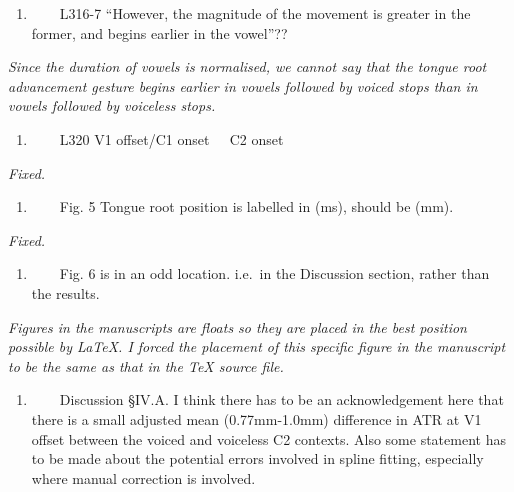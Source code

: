 \documentclass[]{article}
\providecommand{\tightlist}{%
  \setlength{\itemsep}{0pt}\setlength{\parskip}{0pt}}
\begin{document}
\begin{enumerate}
\def\labelenumi{\arabic{enumi}.}
\setcounter{enumi}{11}
\tightlist
\item
  ~~~~L316-7 ``However, the magnitude of the movement is greater in the
  former, and begins earlier in the vowel''??
\end{enumerate}

\begin{adjustwidth}{1cm}{} \textit{
Since the duration of vowels is normalised, we cannot say that the tongue root advancement gesture begins earlier in vowels followed by voiced stops than in vowels followed by voiceless stops.
} \end{adjustwidth}

\begin{enumerate}
\def\labelenumi{\arabic{enumi}.}
\setcounter{enumi}{12}
\tightlist
\item
  ~~~~L320 V1 offset/C1 onset ~ C2 onset
\end{enumerate}

\begin{adjustwidth}{1cm}{} \textit{
Fixed.
} \end{adjustwidth}

\begin{enumerate}
\def\labelenumi{\arabic{enumi}.}
\setcounter{enumi}{13}
\tightlist
\item
  ~~~~Fig. 5 Tongue root position is labelled in (ms), should be (mm).
\end{enumerate}

\begin{adjustwidth}{1cm}{} \textit{
Fixed.
} \end{adjustwidth}

\begin{enumerate}
\def\labelenumi{\arabic{enumi}.}
\setcounter{enumi}{14}
\tightlist
\item
  ~~~~Fig. 6 is in an odd location. i.e.~in the Discussion section,
  rather than the results.
\end{enumerate}

\begin{adjustwidth}{1cm}{} \textit{
Figures in the manuscripts are floats so they are placed in the best position possible by LaTeX. I forced the placement of this specific figure in the manuscript to be the same as that in the TeX source file.
} \end{adjustwidth}

\begin{enumerate}
\def\labelenumi{\arabic{enumi}.}
\setcounter{enumi}{15}
\tightlist
\item
  ~~~~Discussion §IV.A. I think there has to be an acknowledgement here
  that there is a small adjusted mean (0.77mm-1.0mm) difference in ATR
  at V1 offset between the voiced and voiceless C2 contexts. Also some
  statement has to be made about the potential errors involved in spline
  fitting, especially where manual correction is involved.
\end{enumerate}
\end{document}
